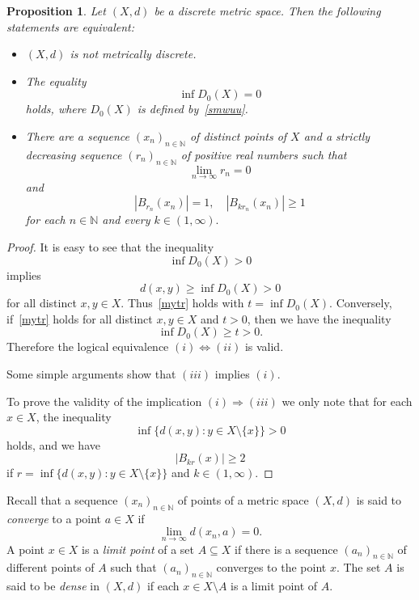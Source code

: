 \documentclass[11pt]{article}
\newtheorem{proposition}[theorem]{Proposition}
\theoremstyle{definition}
\theoremstyle{remark}
\numberwithin{equation}{section}
\begin{document}
\begin{proposition}\label{qsswd}
Let $(X,d)$ be a discrete metric space.  
Then the following statements are equivalent:
\begin{itemize}[left=10pt]
    \item[(i)] $(X,d)$ is not metrically discrete.
    \item[(ii)] The equality
    \begin{equation}
        \label{llkk}
        \inf D_0(X) =0
        \end{equation}
    holds, where $D_0(X)$ is defined by~\eqref{smwuu}.
    \item[(iii)] There are a sequence $(x_n)_{n\in\mathbb{N}}$ of distinct points of $X$ 
    and a strictly decreasing sequence $(r_n)_{n\in\mathbb{N}}$ of  positive real numbers 
    such that 
    $$
    \lim\limits_{n\to\infty}r_n=0
    $$
    and
$$
\left|B_{r_n}(x_n)\right|=1,\quad \left|B_{kr_n}(x_n)\right|\geq 1
$$
    for each $n\in {\mathbb N}$ and every $k\in (1,\infty).$
\end{itemize}
\end{proposition}

\begin{proof}
It is easy to see that the inequality
\[
    \inf D_0(X) > 0
\]
implies
\[
    d(x,y) \geq \inf D_0(X) > 0
\]
for all distinct $x,y \in X$.  
Thus~\eqref{mytr} holds with $t = \inf D_0(X)$.  
Conversely, if~\eqref{mytr} holds for all distinct $x,y\in X$ and $t>0$, then we have the inequality
\[
    \inf D_0(X) \geq t > 0.
\]
Therefore the logical equivalence $(i) \Leftrightarrow (ii)$ is valid.

Some simple arguments show that $(iii)$ implies $(i)$.  

To prove the validity of the implication $(i) \Rightarrow (iii)$ we only note that for each $x \in X$,
the inequality
\[
\inf \{ d(x,y) : y \in X \setminus \{x\} \} > 0
\]
holds, and
we have
\[
|B_{k r}(x)| \geq 2
\]
if 
$
r = \inf \{ d(x,y) : y \in X \setminus \{x\} \}
$
and $k \in (1,\infty)$.

\end{proof}




Recall that a sequence $(x_n)_{n \in \mathbb{N}}$ of points of a metric space $(X, d)$ is said to {\it converge} to a point $a \in X$ if
\begin{equation*}
    \lim_{n \to \infty} d(x_n, a) = 0.
\end{equation*}
 A point $x \in X$ is a \textit{limit point}  of a set $A \subseteq X$ if there is a sequence $(a_n)_{n \in \mathbb{N}}$ of different points of $A$ such that $(a_n)_{n \in \mathbb{N}}$ converges to the point $x$.
The set $A$ is said to be {\it dense} in $(X,d)$ if each $x\in X\setminus A$ is a limit point of $A$.
\end{document}
